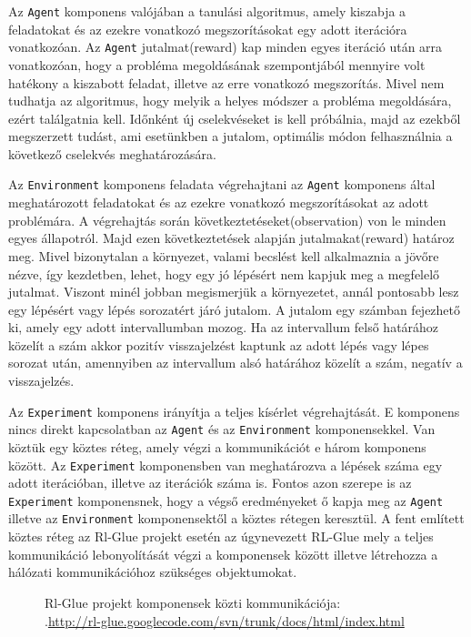 	Az \texttt{Agent} komponens valójában a tanulási algoritmus, amely kiszabja a feladatokat és az ezekre vonatkozó megszorításokat egy adott iterációra vonatkozóan. Az \texttt{Agent} jutalmat(reward) kap minden egyes iteráció után arra vonatkozóan, hogy a probléma megoldásának szempontjából mennyire volt hatékony a kiszabott feladat, illetve az erre vonatkozó megszorítás. Mivel nem tudhatja az algoritmus, hogy melyik a helyes módszer a probléma megoldására, ezért találgatnia kell. Időnként új cselekvéseket is kell próbálnia, majd az ezekből megszerzett tudást, ami esetünkben a jutalom, optimális módon felhasználnia a következő cselekvés meghatározására. 
	
	Az \texttt{Environment} komponens feladata végrehajtani az \texttt{Agent} komponens által meghatározott feladatokat és az ezekre vonatkozó megszorításokat az adott problémára. A végrehajtás során következtetéseket(observation) von le minden egyes állapotról. Majd ezen következtetések alapján jutalmakat(reward) határoz meg. Mivel bizonytalan a környezet,    valami becslést kell alkalmaznia a jövőre nézve, így kezdetben, lehet, hogy egy jó lépésért nem kapjuk meg a megfelelő jutalmat. Viszont minél jobban megismerjük a környezetet, annál pontosabb lesz egy lépésért vagy lépés sorozatért járó jutalom. A jutalom egy számban fejezhető ki, amely egy adott intervallumban mozog. Ha az intervallum felső határához közelít a szám akkor pozitív visszajelzést kaptunk az adott lépés vagy lépes sorozat után, amennyiben az intervallum alsó határához közelít a szám, negatív a visszajelzés.
	
	Az \texttt{Experiment} komponens irányítja a teljes kísérlet végrehajtását. E komponens nincs direkt kapcsolatban az \texttt{Agent} és az \texttt{Environment} komponensekkel. Van köztük egy köztes réteg, amely végzi a kommunikációt e három komponens között.  Az \texttt{Experiment} komponensben van meghatározva a lépések száma egy adott iterációban, illetve az iterációk száma is. Fontos azon szerepe is az \texttt{Experiment} komponensnek, hogy a végső eredményeket ő kapja meg az \texttt{Agent} illetve az \texttt{Environment} komponensektől a köztes rétegen keresztül.
A fent említett köztes réteg az Rl-Glue projekt esetén az úgynevezett RL-Glue mely a teljes kommunikáció lebonyolítását végzi a komponensek között illetve létrehozza a hálózati kommunikációhoz szükséges objektumokat.

\begin{figure}[t]
  \centering
  \caption[Példa képek beszúrására]%
  {Rl-Glue projekt komponensek közti kommunikációja:\\
  {\white .}\hfill\url{http://rl-glue.googlecode.com/svn/trunk/docs/html/index.html}}
  \label{fig:ALAP:sm1}
\end{figure}

